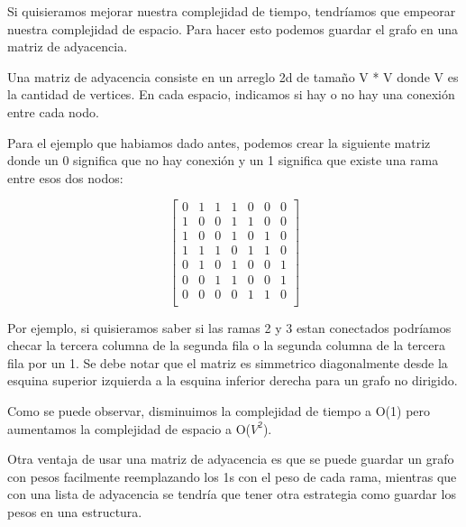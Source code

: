 \documentclass{article}
\begin{document}
Si quisieramos mejorar nuestra complejidad de tiempo, tendríamos que empeorar nuestra complejidad de espacio. Para hacer esto podemos guardar el grafo en una matriz de adyacencia.

Una matriz de adyacencia consiste en un arreglo 2d de tamaño V * V donde V es la cantidad de vertices. En cada espacio, indicamos si hay o no hay una conexión entre cada nodo.

Para el ejemplo que habiamos dado antes, podemos crear la siguiente matriz donde un 0 significa que no hay conexión y un 1 significa que existe una rama entre esos dos nodos:

$$
\begin{bmatrix}
0 & 1 & 1 & 1 & 0 & 0 & 0 \\
1 & 0 & 0 & 1 & 1 & 0 & 0 \\
1 & 0 & 0 & 1 & 0 & 1 & 0 \\
1 & 1 & 1 & 0 & 1 & 1 & 0 \\
0 & 1 & 0 & 1 & 0 & 0 & 1 \\
0 & 0 & 1 & 1 & 0 & 0 & 1 \\
0 & 0 & 0 & 0 & 1 & 1 & 0 \\
\end{bmatrix}
$$

Por ejemplo, si quisieramos saber si las ramas 2 y 3 estan conectados podríamos checar la tercera columna de la segunda fila o la segunda columna de la tercera fila por un 1. Se debe notar que el matriz es simmetrico diagonalmente desde la esquina superior izquierda a la esquina inferior derecha para un grafo no dirigido.

Como se puede observar, disminuimos la complejidad de tiempo a O(1) pero aumentamos la complejidad de espacio a O($V^2$).

Otra ventaja de usar una matriz de adyacencia es que se puede guardar un grafo con pesos facilmente reemplazando los 1s con el peso de cada rama, mientras que con una lista de adyacencia se tendría que tener otra estrategia como guardar los pesos en una estructura.
\end{document}
